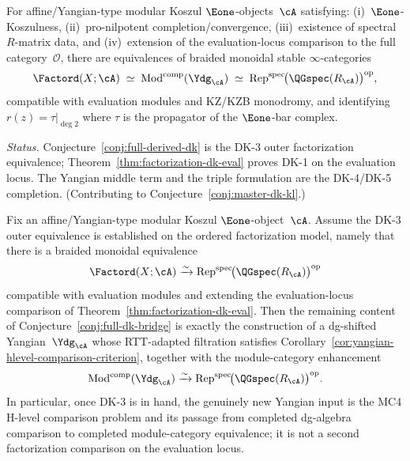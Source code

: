 \begin{conjecture}
\label{conj:full-dk-bridge}
For affine/Yangian-type modular Koszul $\Eone$-objects~$\cA$
satisfying:
\textup{(i)}~$\Eone$-Koszulness,
\textup{(ii)}~pro-nilpotent completion/convergence,
\textup{(iii)}~existence of spectral $R$-matrix data, and
\textup{(iv)}~extension of the evaluation-locus comparison to
the full category~$\mathcal{O}$,
there are equivalences of braided monoidal stable
$\infty$-categories
\begin{equation}\label{eq:triple-equivalence}
\Factord(X;\cA)
\;\simeq\;
\operatorname{Mod}^{\mathrm{comp}}(\Ydg_{\cA})
\;\simeq\;
\operatorname{Rep}^{\mathrm{spec}}\!
  \bigl(\QGspec(R_{\cA})\bigr)^{\mathrm{op}},
\end{equation}
compatible with evaluation modules and KZ/KZB monodromy,
and identifying $r(z) = \tau|_{\deg 2}$ where $\tau$ is
the propagator of the $\Eone$-bar complex.

\smallskip\noindent
\emph{Status.}
Conjecture~\textup{\ref{conj:full-derived-dk}} is the DK-3 outer
factorization equivalence; Theorem~\textup{\ref{thm:factorization-dk-eval}}
proves DK-1 on the evaluation locus.  The Yangian middle term and the
triple formulation are the DK-4/DK-5 completion.
(Contributing to Conjecture~\ref{conj:master-dk-kl}.)
\end{conjecture}

\begin{proposition}
\label{prop:yangian-dk-mc4-reduction}
Fix an affine/Yangian-type modular Koszul $\Eone$-object~$\cA$.
Assume the DK-3 outer equivalence is established on the ordered
factorization model, namely that there is a braided monoidal
equivalence
\[
\Factord(X;\cA)
\xrightarrow{\sim}
\operatorname{Rep}^{\mathrm{spec}}\!
  \bigl(\QGspec(R_{\cA})\bigr)^{\mathrm{op}}
\]
compatible with evaluation modules and extending the
evaluation-locus comparison of
Theorem~\ref{thm:factorization-dk-eval}.  Then the remaining content of
Conjecture~\ref{conj:full-dk-bridge} is exactly the construction of a
dg-shifted Yangian~$\Ydg_{\cA}$ whose RTT-adapted filtration satisfies
Corollary~\ref{cor:yangian-hlevel-comparison-criterion}, together with
the module-category enhancement
\[
\operatorname{Mod}^{\mathrm{comp}}(\Ydg_{\cA})
\xrightarrow{\sim}
\operatorname{Rep}^{\mathrm{spec}}\!
  \bigl(\QGspec(R_{\cA})\bigr)^{\mathrm{op}}.
\]
In particular, once DK-3 is in hand, the genuinely new Yangian input is
the MC4 H-level comparison problem and its passage from completed
dg-algebra comparison to completed module-category equivalence; it is
not a second factorization comparison on the evaluation locus.
\end{proposition}

